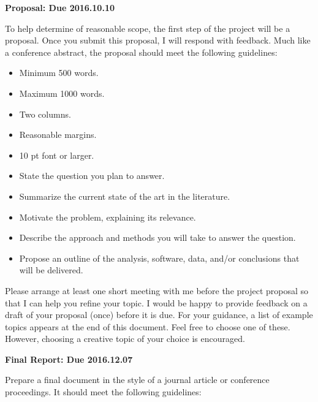\documentclass[12pts, answers]{exam}
\newcommand{\duedate}{2016.12.07}
\begin{document}
\begin{questions}
\addpoints
\question[10] \textbf{Proposal: Due 2016.10.10}

To help determine of reasonable scope, the first step of the project will be a
proposal. Once you submit this proposal, I will respond with feedback. Much
like a conference abstract, the proposal should meet the following guidelines:

\begin{itemize}
\item Minimum 500 words.
\item Maximum 1000 words.
\item Two columns.
\item Reasonable margins.
\item 10 pt font or larger.
\item State the question you plan to answer.
\item Summarize the current state of the art in the literature.
\item Motivate the problem, explaining its relevance.
\item Describe the approach and methods you will take to answer the question.
\item Propose an outline of the analysis, software, data, and/or conclusions that will be delivered.
\end{itemize}

Please arrange at least one short meeting with me before the project proposal 
so that I can help you refine your topic. I would be happy to provide feedback 
on a draft of your proposal (once) before it is due. For your guidance, a list 
of example topics appears at the end of this document. Feel free to choose one 
of these.  However, choosing a creative topic of your choice is 
encouraged.


\question[90] \textbf{Final Report: Due \duedate}

Prepare a final document in the style of a journal article or conference 
proceedings. It should meet the following guidelines:


\end{questions}
\end{document}

